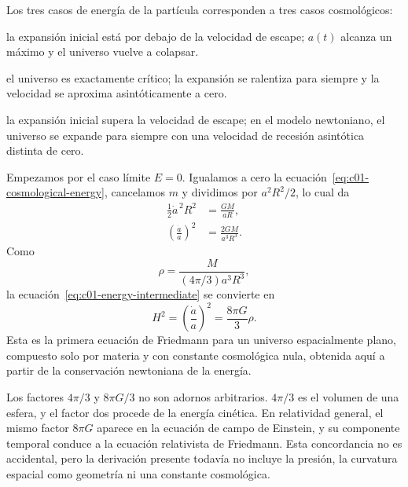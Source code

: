 Los tres casos de energía de la partícula corresponden a tres casos cosmológicos:
\begin{description}[style=nextline]
\item[\(E<0\):] la expansión inicial está por debajo de la velocidad de escape; \(a(t)\) alcanza un máximo y el universo vuelve a colapsar.
\item[\(E=0\):] el universo es exactamente crítico; la expansión se ralentiza para siempre y la velocidad se aproxima asintóticamente a cero.
\item[\(E>0\):] la expansión inicial supera la velocidad de escape; en el modelo newtoniano, el universo se expande para siempre con una velocidad de recesión asintótica distinta de cero.
\end{description}

Empezamos por el caso límite \(E=0\). Igualamos a cero la ecuación~\eqref{eq:c01-cosmological-energy}, cancelamos \(m\) y dividimos por \(a^2R^2/2\), lo cual da
\begin{align}
\frac12\dot a^{\,2}R^2&=\frac{GM}{aR}, \\
\left(\frac{\dot a}{a}\right)^2&=\frac{2GM}{a^3R^3}.
\label{eq:c01-energy-intermediate}
\end{align}
Como
\begin{equation}
\rho=\frac{M}{(4\pi/3)a^3R^3},
\end{equation}
la ecuación~\eqref{eq:c01-energy-intermediate} se convierte en
\begin{equation}
\boxed{
H^2=\left(\frac{\dot a}{a}\right)^2=\frac{8\pi G}{3}\rho.
}
\label{eq:c01-first-friedmann}
\end{equation}
Esta es la primera ecuación de Friedmann para un universo espacialmente plano, compuesto solo por materia y con constante cosmológica nula, obtenida aquí a partir de la conservación newtoniana de la energía.

\begin{classroomqa}
\end{classroomqa}

Los factores \(4\pi/3\) y \(8\pi G/3\) no son adornos arbitrarios. \(4\pi/3\) es el volumen de una esfera, y el factor dos procede de la energía cinética. En relatividad general, el mismo factor \(8\pi G\) aparece en la ecuación de campo de Einstein, y su componente temporal conduce a la ecuación relativista de Friedmann. Esta concordancia no es accidental, pero la derivación presente todavía no incluye la presión, la curvatura espacial como geometría ni una constante cosmológica.

